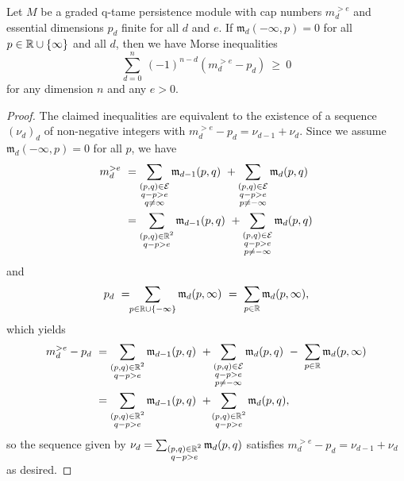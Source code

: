 \begin{thm}
	Let $M$ be a graded q-tame persistence module with cap numbers $m_{d}^{> e }$ and essential dimensions $p_{d}$ finite for all $d$ and $e$.
	If $\mathfrak{m}_d(-\infty, p) = 0$ for all $p \in \mathbb{R} \cup \{\infty\}$ and all $d$, then we have Morse inequalities
    \begin{equation} \label{e:morse inequalities}
    \sum_{d=0}^n \ (-1)^{n-d} (m^{>e}_{d} - p_{d}) \ \geq\  0
    \end{equation}
    for any dimension $n$ and any $e > 0$.
\end{thm}

\begin{proof}
    The claimed inequalities are equivalent to the existence of a sequence $(\nu_d)_d$ of non-negative integers with $m^{>e}_{d} - p_{d} = \nu_{d-1} + \nu_{d}$.
    Since we assume $\mathfrak{m}_d(-\infty, p) = 0$ for all $p$, we have
    \begin{align*}
    m^{>e}_{d}
    \ &=
    \sum_{\substack{(p,q) \in \mathcal{E} \\ q - p > e \\ q \neq \infty}} \mathfrak{m}_{d-1}(p,q)
    \ +
    \sum_{\substack{(p,q) \in \mathcal{E} \\ q - p > e \\ p \neq -\infty}}\mathfrak{m}_d(p,q)
    \\
    &=
    \sum_{\substack{(p,q) \in \mathbb{R}^2 \\ q - p > e }} \mathfrak{m}_{d-1}(p,q)
    \ +
    \sum_{\substack{(p,q) \in \mathcal{E} \\ q - p > e \\ p \neq -\infty}}\mathfrak{m}_d(p,q)
    \end{align*}
    and
    \begin{equation*}
    p_{d}
    \ = \!\!
    \sum_{p \in \mathbb{R} \cup \{-\infty\}} \mathfrak{m}_d(p,\infty)
    \ = \
    \sum_{p \in \mathbb{R}} \mathfrak{m}_d(p,\infty),
    \end{equation*}
    which yields
    \begin{align*}
    m^{>e}_{d} - p_{d} \
    &= 
    \sum_{\substack{(p,q) \in \mathbb{R}^2 \\ q - p > e }} \mathfrak{m}_{d-1}(p,q)
    \ +
    \sum_{\substack{(p,q) \in \mathcal{E} \\ q - p > e \\ p \neq -\infty}}\mathfrak{m}_d(p,q)
    \ - \
    \sum_{p \in \mathbb{R}} \mathfrak{m}_d(p,\infty)
    \\
    &=
    \sum_{\substack{(p,q) \in \mathbb{R}^2 \\ q - p > e }} \mathfrak{m}_{d-1}(p,q)
    \ + \!
    \sum_{\substack{(p,q) \in \mathbb{R}^2 \\ q - p > e }}\mathfrak{m}_d(p,q),
    \end{align*}
    so the sequence given by $\nu_d = \sum_{\substack{(p,q) \in \mathbb{R}^2 \\ q - p > e }}\mathfrak{m}_d(p,q)$ satisfies $m^{>e}_{d} - p_{d} = \nu_{d-1} + \nu_{d}$ as desired.
\end{proof}

